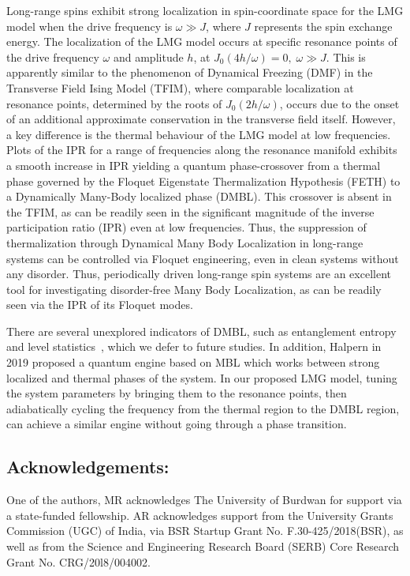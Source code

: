 \documentclass[%
reprint,
superscriptaddress,
linenumbers,
amsmath,amssymb,
aps,
prb,
showkeys,
]{revtex4-2}
\begin{document}
	 Long-range spins exhibit strong localization in spin-coordinate space for the LMG model when the drive frequency is $\omega \gg J$, where $J$ represents the spin exchange energy. The localization of the LMG model occurs at specific resonance points of the drive frequency $\omega$ and amplitude $h$, at $J_0(4h/\omega)=0,\; \omega \gg J$. This is apparently similar to the phenomenon of Dynamical Freezing (DMF) in the Transverse Field Ising Model (TFIM), where comparable localization at resonance points, determined by the roots of $J_0(2h/\omega)$, occurs due to the onset of an additional approximate conservation in the transverse field itself. However, a key difference is the thermal behaviour of the LMG model at low frequencies. Plots of the IPR for a range of frequencies along the resonance manifold exhibits a smooth increase in IPR yielding a quantum phase-crossover from a thermal phase governed by the Floquet Eigenstate Thermalization Hypothesis (FETH) to a Dynamically Many-Body localized phase (DMBL). This crossover is absent in the TFIM, as   can be readily seen in the significant magnitude of the inverse participation ratio (IPR) even at low frequencies. Thus, the suppression  of thermalization through  Dynamical Many Body Localization in long-range systems can be controlled via Floquet engineering, even in clean systems without any disorder.	Thus, periodically driven long-range spin systems are an excellent tool for investigating disorder-free Many Body Localization, as can be readily seen via the IPR of its Floquet modes. 
	
	There are several unexplored indicators of DMBL, such as entanglement entropy and level statistics~\cite{khemani_phase_2016}, which we defer to future studies. In addition, Halpern in 2019 proposed a quantum engine based on MBL\cite{yunger_halpern_quantum_2019} which works  between strong localized and thermal phases of the system. In our proposed LMG model, tuning the system parameters by bringing them to the resonance points, then adiabatically cycling the frequency from the thermal region to the DMBL region, can achieve a similar engine without going through a phase transition. 
	
	\subsection {Acknowledgements:}
	One of the authors, MR acknowledges The University of Burdwan for support via a state-funded fellowship. AR acknowledges support from the University Grants Commission (UGC) of India, via BSR Startup Grant No. F.30-425/2018(BSR), as well as from the Science and Engineering Research Board (SERB) Core Research Grant No. CRG/20l8/004002.
	
	
	
\end{document}
